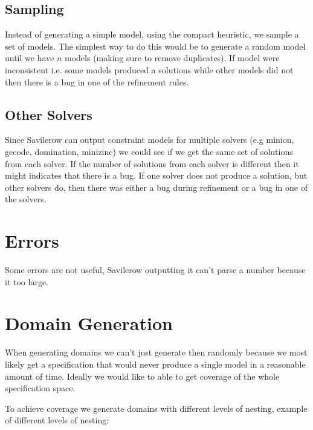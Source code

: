 \subsection{Sampling}

Instead of generating a simple model, using the compact heuristic, we sample a set of models. The simplest way to do this would be to generate a random model until we have $n$ models (making sure to remove duplicates).  If model were inconsistent i.e. some models produced a solutions while other models did not then there is a bug in one of the refinement rules.

\subsection{Other Solvers}

Since Savilerow can output constraint models for multiple solvers (e.g minion, gecode, domination, minizinc) we could see if we get the same set of solutions from each solver. If the number of solutions from each solver is different then it might indicates that there is a bug.  If one solver does not produce a solution, but other solvers do, then there was either a bug during refinement or a bug in one of the solvers.

\section{Errors}

Some errors are not useful,  Savilerow outputting it can't parse a number because it too large. 

\section{Domain Generation}

When generating domains we can't just generate then randomly because we most likely get a specification that would never produce a single model in a reasonable amount of time.  Ideally we would like to able to get coverage of the whole specification space.  

To achieve coverage we generate domains with different levels of nesting, example of different levels of nesting:

